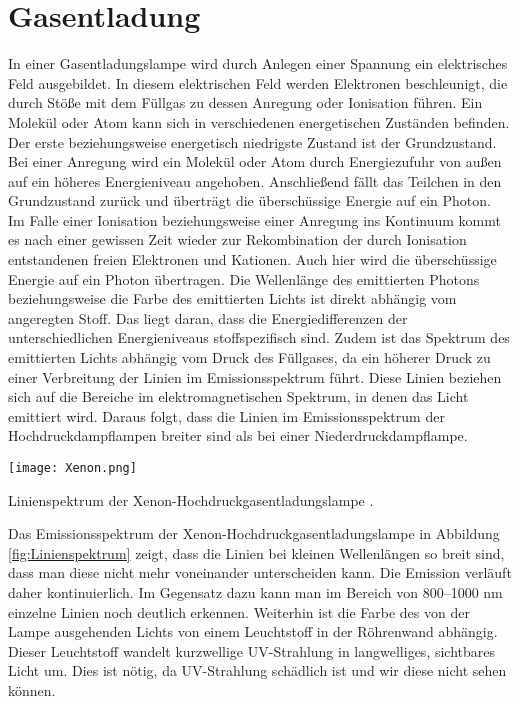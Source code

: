 \section{Gasentladung}

In einer Gasentladungslampe wird durch Anlegen einer Spannung ein elektrisches
Feld ausgebildet.
\cite{Gerthsen, Light_sources, CIUZ:Lichtquellen}
In diesem elektrischen Feld werden Elektronen beschleunigt, die durch Stöße mit dem Füllgas zu dessen Anregung oder Ionisation führen. Ein Molekül oder Atom kann sich in verschiedenen energetischen Zuständen befinden. Der erste beziehungsweise energetisch niedrigste Zustand ist der Grundzustand. Bei einer Anregung wird ein Molekül oder Atom durch Energiezufuhr von außen auf ein höheres Energieniveau angehoben. Anschließend fällt das Teilchen in den Grundzustand zurück und überträgt die überschüssige Energie auf ein Photon. Im Falle einer Ionisation beziehungsweise einer Anregung ins Kontinuum kommt es nach einer gewissen Zeit wieder zur Rekombination der durch Ionisation entstandenen freien Elektronen und Kationen. Auch hier wird die überschüssige Energie auf ein Photon übertragen.
Die Wellenlänge des emittierten Photons beziehungsweise die Farbe des emittierten Lichts ist direkt abhängig vom angeregten Stoff. Das liegt daran, dass die Energiedifferenzen der unterschiedlichen Energieniveaus stoffspezifisch sind. 
Zudem ist das Spektrum des emittierten Lichts abhängig vom Druck des Füllgases, da ein höherer Druck zu einer Verbreitung der Linien im Emissionsspektrum führt. Diese Linien beziehen sich auf die Bereiche im elektromagnetischen Spektrum, in denen das Licht emittiert wird. Daraus folgt, dass die Linien im Emissionsspektrum der Hochdruckdampflampen breiter sind als bei einer Niederdruckdampflampe.

\begin{dsafigure}
 \centering
 \texttt{[image: Xenon.png]}
 \caption{Linienspektrum der Xenon-Hochdruckgasentladungslampe
         \cite{XenonArcLamp_wikipedia}.
         }
 \label{fig:Linienspektrum}
\end{dsafigure}

Das Emissionsspektrum der Xenon-Hochdruckgasentladungslampe in Abbildung \ref{fig:Linienspektrum} zeigt, dass die Linien bei kleinen Wellenlängen so breit sind, dass man diese nicht mehr voneinander unterscheiden kann. Die Emission verläuft daher kontinuierlich. Im Gegensatz dazu kann man im Bereich von 800--1000 nm einzelne Linien noch deutlich erkennen.
Weiterhin ist die Farbe des von der Lampe ausgehenden Lichts von einem Leuchtstoff in der Röhrenwand abhängig. Dieser Leuchtstoff wandelt kurzwellige UV-Strahlung in langwelliges, sichtbares Licht um.
Dies ist nötig, da UV-Strahlung schädlich ist und wir diese nicht sehen können.
